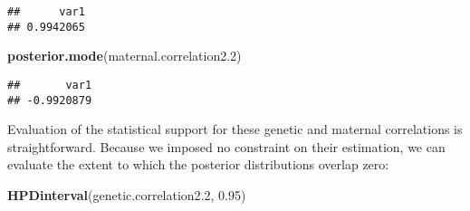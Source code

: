 \documentclass[12pt,]{book}
\newenvironment{Shaded}{\begin{snugshade}}{\end{snugshade}}
\newcommand{\FloatTok}[1]{\textcolor[rgb]{0.00,0.00,0.81}{#1}}
\newcommand{\KeywordTok}[1]{\textcolor[rgb]{0.13,0.29,0.53}{\textbf{#1}}}
\newcommand{\NormalTok}[1]{#1}
\newcommand{\OperatorTok}[1]{\textcolor[rgb]{0.81,0.36,0.00}{\textbf{#1}}}
\newcommand{\StringTok}[1]{\textcolor[rgb]{0.31,0.60,0.02}{#1}}
\begin{document}
\begin{Shaded}
\end{Shaded}

\begin{verbatim}
##      var1 
## 0.9942065
\end{verbatim}

\begin{Shaded}
\begin{Highlighting}[]
\KeywordTok{posterior.mode}\NormalTok{(maternal.correlation2}\FloatTok{.2}\NormalTok{)}
\end{Highlighting}
\end{Shaded}

\begin{verbatim}
##       var1 
## -0.9920879
\end{verbatim}

Evaluation of the statistical support for these genetic and maternal correlations is straightforward. Because we imposed no constraint on their estimation, we can evaluate the extent to which the posterior distributions overlap zero:

\begin{Shaded}
\begin{Highlighting}[]
\KeywordTok{HPDinterval}\NormalTok{(genetic.correlation2}\FloatTok{.2}\NormalTok{, }\FloatTok{0.95}\NormalTok{)}
\end{Highlighting}
\end{Shaded}
\end{document}
